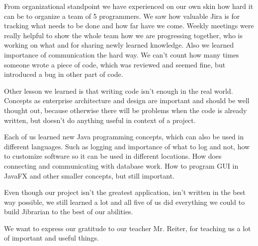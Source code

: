 \documentclass[11pt,twoside,a4paper]{article}
\begin{document}
From organizational standpoint we have experienced on our own skin how hard it
can be to organize a team of 5 programmers. We saw how valuable Jira is for
tracking what needs to be done and how far have we come. Weekly meetings were
really helpful to show the whole team how we are progressing together, who is
working on what and for sharing newly learned knowledge. Also we learned
importance of communication the hard way. We can't count how many times someone
wrote a piece of code, which was reviewed and seemed fine, but introduced
a bug in other part of code.

Other lesson we learned is that writing code isn't enough in the real world.
Concepts as enterprise architecture and design are important and should be well
thought out, because otherwise there will be problems when the code is already
written, but doesn't do anything useful in context of a project.

Each of us learned new Java programming concepts, which can also be used in
different languages. Such as logging and importance of what to log and not,
how to customize software so it can be used in different locations. How does
connecting and communicating with database work. How to program GUI in JavaFX
and other smaller concepts, but still important.

Even though our project isn't the greatest application, isn't written in
the best way possible, we still learned a lot and all five of us did everything
we could to build Jibrarian to the best of our abilities.

We want to express our gratitude to our teacher Mr. Reiter, for teaching us a lot
of important and useful things.
\end{document}
